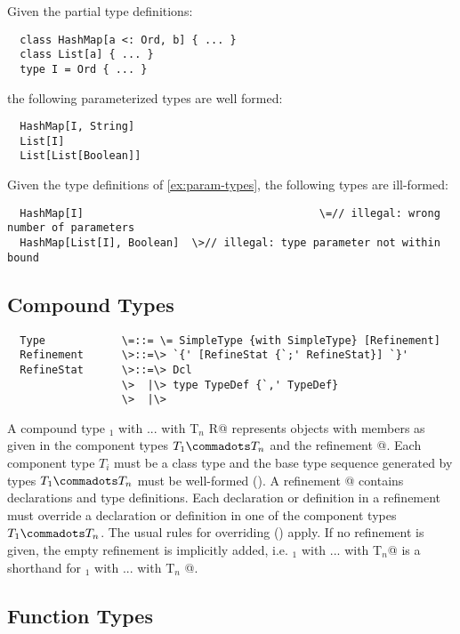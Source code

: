 \documentclass[11pt]{report}
\begin{document}
\example\label{ex:param-types}
Given the partial type definitions:

\begin{verbatim}
  class HashMap[a <: Ord, b] { ... }
  class List[a] { ... }
  type I = Ord { ... }
\end{verbatim}

the following parameterized types are well formed:

\begin{verbatim}
  HashMap[I, String]
  List[I]
  List[List[Boolean]]
\end{verbatim}

\example Given the type definitions of \ref{ex:param-types},
the following types are ill-formed:

\begin{verbatim}
  HashMap[I]			                         \=// illegal: wrong number of parameters
  HashMap[List[I], Boolean]  \>// illegal: type parameter not within bound
\end{verbatim}

\subsection{Compound Types}
\label{sec:compound-types}

\syntax\begin{verbatim} 
  Type            \=::= \= SimpleType {with SimpleType} [Refinement]
  Refinement      \>::=\> `{' [RefineStat {`;' RefineStat}] `}'
  RefineStat      \>::=\> Dcl
                  \>  |\> type TypeDef {`,' TypeDef}
                  \>  |\>
\end{verbatim}

A compound type \verb@T$_1$ with ... with T$_n$ {R}@ represents
objects with members as given in the component types $T_1 \commadots
T_n$ and the refinement @. Each component type $T_i$ must be a
class type and the base type sequence generated by types $T_1
\commadots T_n$ must be well-formed (). A
refinement @ contains declarations and type
definitions. Each declaration or definition in a refinement must
override a declaration or definition in one of the component types
$T_1 \commadots T_n$. The usual rules for overriding (\sref{})
apply. If no refinement is given, the empty refinement is implicitly
added, i.e. \verb@T$_1$ with ... with T$_n$@ is a shorthand for
\verb@T$_1$ with ... with T$_n$ {}@.
 
\subsection{Function Types}
\label{sec:function-types}
\end{document}
